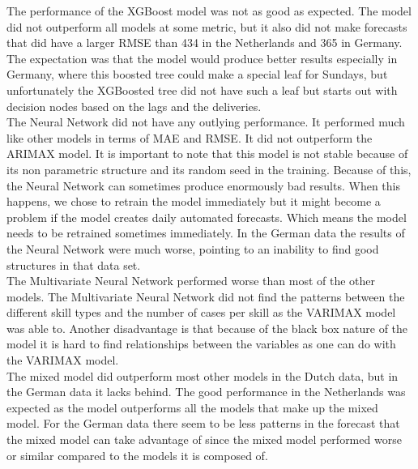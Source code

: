 The performance of the XGBoost model was not as good as expected. The model did not outperform all models at some metric, but it also did not make forecasts that did have a larger RMSE than 434 in the Netherlands and 365 in Germany. The expectation was that the model would produce better results especially in Germany, where this boosted tree could make a special leaf for Sundays, but unfortunately the XGBoosted tree did not have such a leaf but starts out with decision nodes based on the lags and the deliveries. \\

The Neural Network did not have any outlying performance. It performed much like other models in terms of MAE and RMSE. It did not outperform the ARIMAX  model. It is important to note that this model is not stable because of its non parametric structure and its random seed in the training. Because of this, the Neural Network can sometimes produce enormously bad results. When this happens, we chose to retrain the model immediately but it might become a problem if the model creates daily automated forecasts. Which means the model needs to be retrained sometimes immediately. In the German data the results of the Neural Network were much worse, pointing to an inability to find good structures in that data set.\\

The Multivariate Neural Network performed worse than most of the other models. The Multivariate Neural Network did not find the patterns between the different skill types and the number of cases per skill as the VARIMAX model was able to. Another disadvantage is that because of the black box nature of the model it is hard to find relationships between the variables as one can do with the VARIMAX model.\\

The mixed model did outperform most other models in the Dutch data, but in the German data it lacks behind. The good performance in the Netherlands was expected as the model outperforms all the models that make up the mixed model. For the German data there seem to be less patterns in the forecast that the mixed model can take advantage of since the mixed model performed worse or similar compared to the models it is composed of.\\

